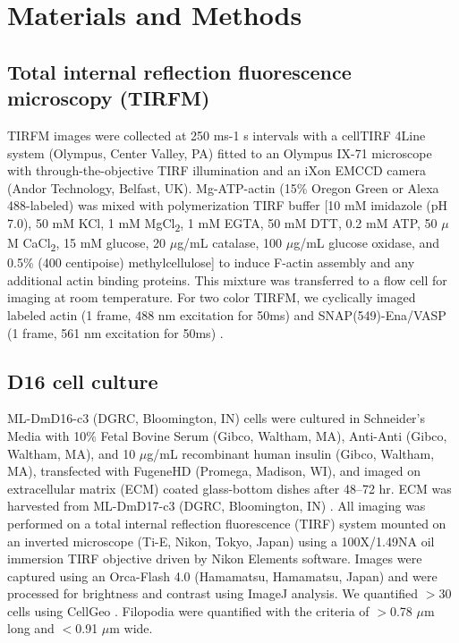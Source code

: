 \section{Materials and Methods}\label{ch02-materials-methods}

\subsection{Total internal reflection fluorescence microscopy (TIRFM)}\label{ena-mm-tirf}

TIRFM images were collected at 250 ms-1 s intervals with a cellTIRF 4Line system (Olympus, Center Valley, PA) fitted to an Olympus IX-71 microscope with through-the-objective TIRF illumination and an iXon EMCCD camera (Andor Technology, Belfast, UK). Mg-ATP-actin (15\% Oregon Green or Alexa 488-labeled) was mixed with polymerization TIRF buffer [10 mM imidazole (pH 7.0), 50 mM KCl, 1 mM MgCl\textsubscript{2}, 1 mM EGTA, 50 mM DTT, 0.2 mM ATP, 50 $\mu$M CaCl\textsubscript{2}, 15 mM glucose, 20 $\mu$g/mL catalase, 100 $\mu$g/mL glucose oxidase, and 0.5\% (400 centipoise) methylcellulose] to induce F-actin assembly and any additional actin binding proteins. This mixture was transferred to a flow cell for imaging at room temperature. For two color TIRFM, we cyclically imaged labeled actin (1 frame, 488 nm excitation for 50ms) and SNAP(549)-Ena/VASP (1 frame, 561 nm excitation for 50ms) \citep{winkelman_ena/vasp_2014}.

\subsection{D16 cell culture}\label{ena-mm-cell-culture}

ML-DmD16-c3 (DGRC, Bloomington, IN) cells were cultured in Schneider's Media with 10\% Fetal Bovine Serum (Gibco, Waltham, MA), Anti-Anti (Gibco, Waltham, MA), and 10 $\mu$g/mL recombinant human insulin (Gibco, Waltham, MA), transfected with FugeneHD (Promega, Madison, WI), and imaged on extracellular matrix (ECM) coated glass-bottom dishes after 48–72 hr. ECM was harvested from ML-DmD17-c3 (DGRC, Bloomington, IN) \citep{currie_using_2011}. All imaging was performed on a total internal reflection fluorescence (TIRF) system mounted on an inverted microscope (Ti-E, Nikon, Tokyo, Japan) using a 100X/1.49NA oil immersion TIRF objective driven by Nikon Elements software. Images were captured using an Orca-Flash 4.0 (Hamamatsu, Hamamatsu, Japan) and were processed for brightness and contrast using ImageJ \citep{schneider_nih_2012} analysis. We quantified $>$30 cells using CellGeo \citep{tsygankov_cellgeo:_2014}. Filopodia were quantified with the criteria of $>$0.78 $\mu$m long and $<$0.91 $\mu$m wide. 

